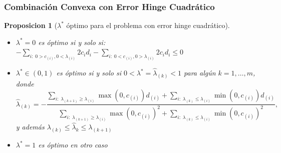 \documentclass{beamer}
\newtheorem{proposition}[theorem]{Proposicion}
\newcommand{\mymax}[1]{\max\left(#1\right)}
\newcommand{\mymin}[1]{\min\left(#1\right)}
\newcommand{\npertask}{m}
\begin{document}
\begin{frame}
      \frametitle{Combinación Convexa con Error Hinge Cuadrático}


      \begin{proposition}[$\lambda^*$ óptimo para el problema con error hinge cuadrático]\nonumber%
            \begin{itemize}
                  \item $\lambda^*=0$ es óptimo si y solo si: $-\sum_{i:\; 0 > c_{(i)}, 0 < \lambda_{(i)}} {2 c_i d_i} - \sum_{i:\; 0 < c_{(i)}, 0 > \lambda_{(i)}} {2 c_i d_i}  \leq 0 $
                  \item $\lambda^* \in (0,1)$ es óptimo si y solo si $0 < \lambda^* = \widehat{\lambda}_{(k)} < 1$ para algún $k=1, \dotsc, \npertask$, donde
                  \begin{equation}\nonumber%
                        \widehat{\lambda}_{(k)} = - \frac{\sum_{i:\; \lambda_{(k+1)} \geq \lambda_{(i)}} \mymax{0, c_{(i)}} d_{(i)} + \sum_{i:\; \lambda_{(k)} \leq \lambda_{(i)}} \mymin{0, c_{(i)}} d_{(i)}}{\sum_{i:\; \lambda_{(k+1)} \geq \lambda_{(i)}} \mymax{0, c_{(i)}}^2 + \sum_{i:\; \lambda_{(k)} \leq \lambda_{(i)}} \mymin{0, c_{(i)}}^2} ,
                  \end{equation}
                  y además $\lambda_{(k)} \leq \widehat{\lambda}_k \leq  \lambda_{(k+1)}$
                  \item $\lambda^*=1$ es óptimo en otro caso
            \end{itemize}
        \end{proposition}


\end{frame}
\end{document}
